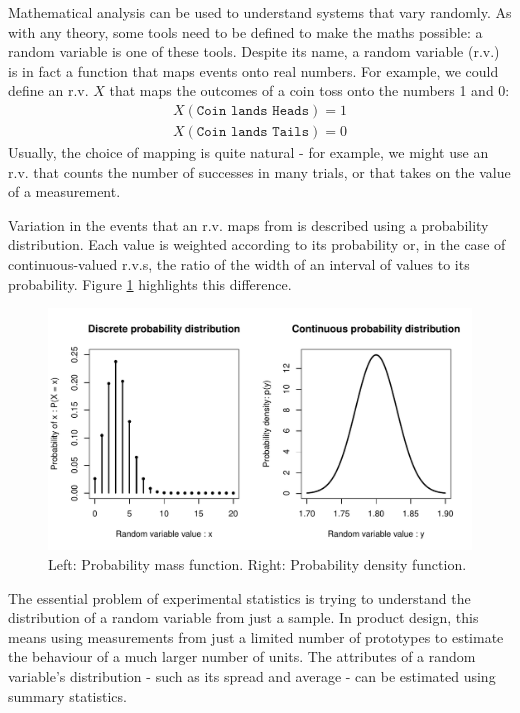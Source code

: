 \documentclass[11pt,a4paper,article]{memoir} %
\begin{document}
Mathematical analysis can be used to understand systems that vary randomly. As with any theory, some tools need to be defined to make the maths possible: a random variable is one of these tools. Despite its name, a random variable (r.v.) is in fact a function that maps events onto real numbers. For example, we could define an r.v. $X$ that maps the outcomes of a coin toss onto the numbers 1 and 0:
 \begin{align}
	X(\texttt{Coin lands Heads}) = 1 \\
	X(\texttt{Coin lands Tails}) =0
 \end{align}
Usually, the choice of mapping is quite natural - for example, we might use an r.v. that counts the number of successes in many trials, or that takes on the value of a measurement. 
\par
Variation in the events that an r.v. maps from is described using a probability distribution. Each value is weighted according to its probability or, in the case of continuous-valued r.v.s, the ratio of the width of an interval of values to its probability. Figure \ref{fig:example_pd} highlights this difference.
\begin{figure}[h!]
\includegraphics[width=\textwidth]{probability_distributions.pdf}
\caption{Left: Probability mass function. Right: Probability density function.}
\label{fig:example_pd}
\end{figure}
\par
The essential problem of experimental statistics is trying to understand the distribution of a random variable from just a sample. In product design, this means using measurements from just a limited number of prototypes to estimate the behaviour of a much larger number of units. The attributes of a random variable's distribution - such as its spread and average - can be estimated using summary statistics.
\end{document}
